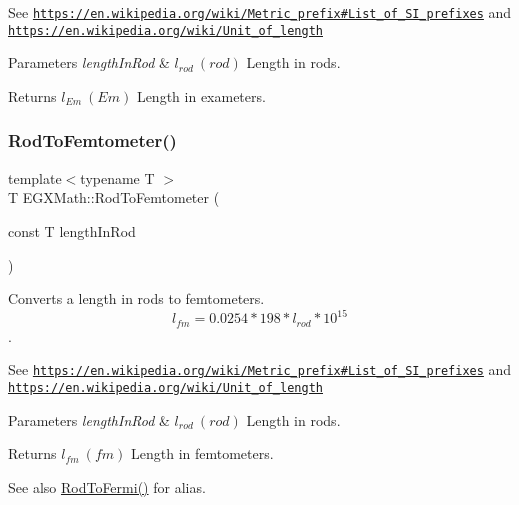 See \href{https://en.wikipedia.org/wiki/Metric_prefix#List_of_SI_prefixes}{\tt https\+://en.\+wikipedia.\+org/wiki/\+Metric\+\_\+prefix\#\+List\+\_\+of\+\_\+\+S\+I\+\_\+prefixes} and \href{https://en.wikipedia.org/wiki/Unit_of_length}{\tt https\+://en.\+wikipedia.\+org/wiki/\+Unit\+\_\+of\+\_\+length} 
\begin{DoxyParams}{Parameters}
{\em length\+In\+Rod} & $ l_{rod}\ (rod)$ Length in rods. \\
\hline
\end{DoxyParams}
\begin{DoxyReturn}{Returns}
$ l_{Em}\ (Em)$ Length in exameters. 
\end{DoxyReturn}
\mbox{\label{group___e_g_x_math-_conversions-_length_conversions-_imperial-_rod-_s_i_ga93c5626ebf87e3f15901731a1e2e9cb3}} 
\subsubsection{\texorpdfstring{Rod\+To\+Femtometer()}{RodToFemtometer()}}
{\footnotesize\ttfamily template$<$typename T $>$ \\
T E\+G\+X\+Math\+::\+Rod\+To\+Femtometer (\begin{DoxyParamCaption}\item[{const T}]{length\+In\+Rod }\end{DoxyParamCaption})}



Converts a length in rods to femtometers. \[ l_{fm}=0.0254 * 198 * l_{rod} * 10^{15} \]. 

See \href{https://en.wikipedia.org/wiki/Metric_prefix#List_of_SI_prefixes}{\tt https\+://en.\+wikipedia.\+org/wiki/\+Metric\+\_\+prefix\#\+List\+\_\+of\+\_\+\+S\+I\+\_\+prefixes} and \href{https://en.wikipedia.org/wiki/Unit_of_length}{\tt https\+://en.\+wikipedia.\+org/wiki/\+Unit\+\_\+of\+\_\+length} 
\begin{DoxyParams}{Parameters}
{\em length\+In\+Rod} & $ l_{rod}\ (rod)$ Length in rods. \\
\hline
\end{DoxyParams}
\begin{DoxyReturn}{Returns}
$ l_{fm}\ (fm)$ Length in femtometers. 
\end{DoxyReturn}
\begin{DoxySeeAlso}{See also}
\mbox{\hyperlink{group___e_g_x_math-_conversions-_length_conversions-_imperial-_rod-_non-_s_i_ga8397c0761e32cb6cfa632854d26023a5}{Rod\+To\+Fermi()}} for alias. 
\end{DoxySeeAlso}
\mbox{\label{group___e_g_x_math-_conversions-_length_conversions-_imperial-_rod-_s_i_ga01d170f936da7b474a5ef3d7b8628d11}} 
